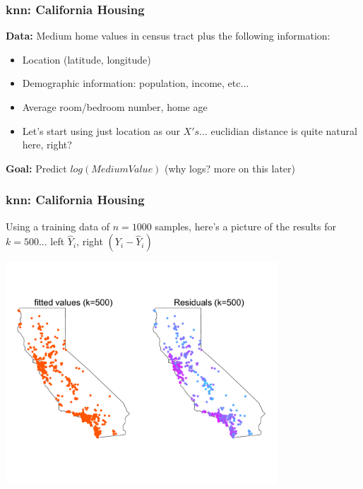 \documentclass[flegn]{beamer}
\newcommand{\skoo}{\vspace{.2in}}
\begin{document}
\begin{frame}
\frametitle{knn: California Housing}
{\bf \color{blue}Data:} Medium home values in census tract plus the following information:
\begin{itemize}
\item Location (latitude, longitude)
\item Demographic information: population, income, etc...
\item Average room/bedroom number, home age
\item Let's start using just location as our $X's$... euclidian distance is quite natural here, right?
\end{itemize}

\skoo
{\bf \color{blue}Goal:} Predict $log(Medium Value)$ {\color{red}(why logs? more on this later)}
\end{frame}

\begin{frame}
\frametitle{knn: California Housing}
Using a training data of $n=1000$ samples, here's a picture of the results for $k=500$... {\color{red} left $\hat{Y}_i$, right $(Y_i-\hat{Y}_i)$}
\vspace{-0.8cm}
\begin{center}
\includegraphics[width=4in]{CAL500}
\end{center}
\end{frame}
\end{document}
